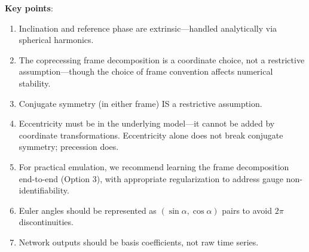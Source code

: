 \documentclass[11pt,a4paper]{article}
\begin{document}
\textbf{Key points}:
\begin{enumerate}
    \item Inclination and reference phase are extrinsic---handled analytically via spherical harmonics.
    \item The coprecessing frame decomposition is a coordinate choice, not a restrictive assumption---though the choice of frame convention affects numerical stability.
    \item Conjugate symmetry (in either frame) IS a restrictive assumption.
    \item Eccentricity must be in the underlying model---it cannot be added by coordinate transformations. Eccentricity alone does not break conjugate symmetry; precession does.
    \item For practical emulation, we recommend learning the frame decomposition end-to-end (Option 3), with appropriate regularization to address gauge non-identifiability.
    \item Euler angles should be represented as $(\sin\alpha, \cos\alpha)$ pairs to avoid $2\pi$ discontinuities.
    \item Network outputs should be basis coefficients, not raw time series.
\end{enumerate}
\end{document}
